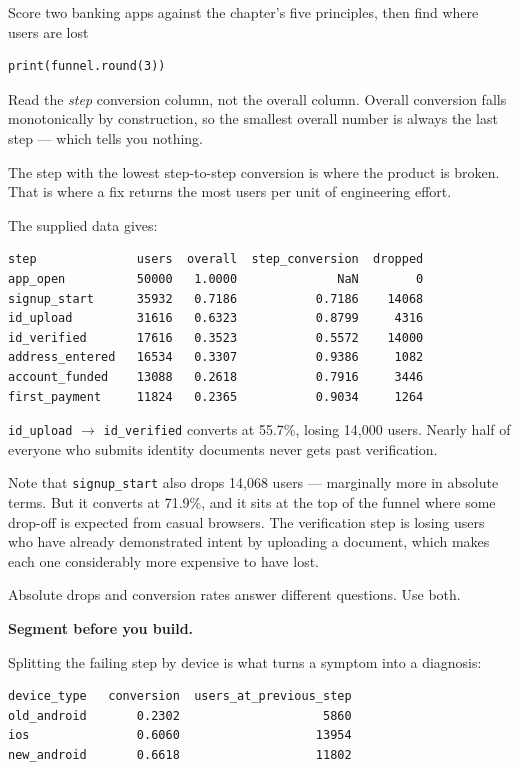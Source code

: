 \begin{labproject}{Score two banking apps against the chapter's five principles, then find where users are lost}
\begin{lstlisting}[style=utppython]
print(funnel.round(3))
\end{lstlisting}

\begin{keyidea}
Read the \emph{step} conversion column, not the overall column. Overall conversion falls monotonically by construction, so the smallest overall number is always the last step --- which tells you nothing.

The step with the lowest step-to-step conversion is where the product is broken. That is where a fix returns the most users per unit of engineering effort.
\end{keyidea}

The supplied data gives:

\begin{lstlisting}[style=utpterminal]
step              users  overall  step_conversion  dropped
app_open          50000   1.0000              NaN        0
signup_start      35932   0.7186           0.7186    14068
id_upload         31616   0.6323           0.8799     4316
id_verified       17616   0.3523           0.5572    14000
address_entered   16534   0.3307           0.9386     1082
account_funded    13088   0.2618           0.7916     3446
first_payment     11824   0.2365           0.9034     1264
\end{lstlisting}

\begin{workedexample}
\texttt{id\_upload} $\rightarrow$ \texttt{id\_verified} converts at 55.7\%, losing 14{,}000 users. Nearly half of everyone who submits identity documents never gets past verification.

Note that \texttt{signup\_start} also drops 14{,}068 users --- marginally more in absolute terms. But it converts at 71.9\%, and it sits at the top of the funnel where some drop-off is expected from casual browsers. The verification step is losing users who have already demonstrated intent by uploading a document, which makes each one considerably more expensive to have lost.

Absolute drops and conversion rates answer different questions. Use both.
\end{workedexample}

\medskip\noindent\textbf{Segment before you build.}\par
Splitting the failing step by device is what turns a symptom into a diagnosis:

\begin{lstlisting}[style=utpterminal]
device_type   conversion  users_at_previous_step
old_android       0.2302                    5860
ios               0.6060                   13954
new_android       0.6618                   11802


\end{lstlisting}
\end{labproject}
